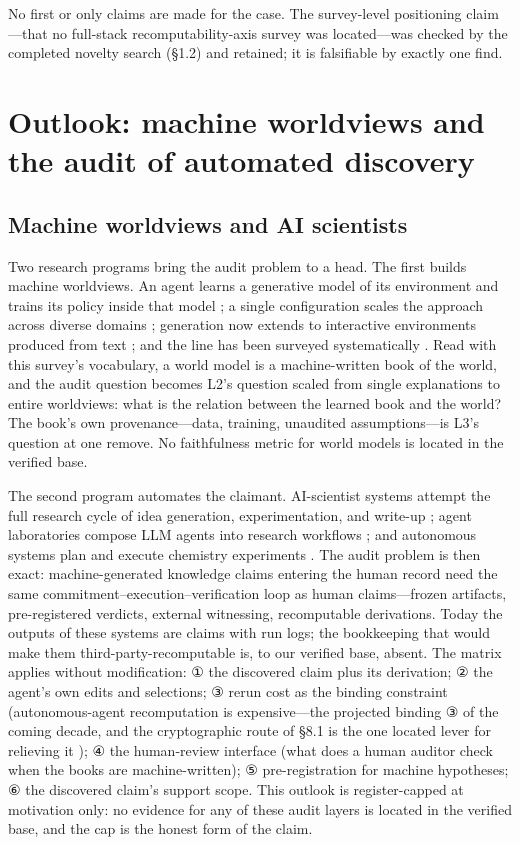 \documentclass[11pt,a4paper]{article}
\begin{document}
No first or only claims are made for the case. The survey-level positioning claim—that no full-stack recomputability-axis survey was located—was checked by the completed novelty search (§1.2) and retained; it is falsifiable by exactly one find.

\section{Outlook: machine worldviews and the audit of automated discovery}

\subsection{Machine worldviews and AI scientists}

Two research programs bring the audit problem to a head. The first builds machine worldviews. An agent learns a generative model of its environment and trains its policy inside that model \cite{key55}; a single configuration scales the approach across diverse domains \cite{key56}; generation now extends to interactive environments produced from text \cite{key57}; and the line has been surveyed systematically \cite{key58}. Read with this survey's vocabulary, a world model is a machine-written book of the world, and the audit question becomes L2's question scaled from single explanations to entire worldviews: what is the relation between the learned book and the world? The book's own provenance—data, training, unaudited assumptions—is L3's question at one remove. No faithfulness metric for world models is located in the verified base.

The second program automates the claimant. AI-scientist systems attempt the full research cycle of idea generation, experimentation, and write-up \cite{key59}; agent laboratories compose LLM agents into research workflows \cite{key60}; and autonomous systems plan and execute chemistry experiments \cite{key61}. The audit problem is then exact: machine-generated knowledge claims entering the human record need the same commitment–execution–verification loop as human claims—frozen artifacts, pre-registered verdicts, external witnessing, recomputable derivations. Today the outputs of these systems are claims with run logs; the bookkeeping that would make them third-party-recomputable is, to our verified base, absent. The matrix applies without modification: ① the discovered claim plus its derivation; ② the agent's own edits and selections; ③ rerun cost as the binding constraint (autonomous-agent recomputation is expensive—the projected binding ③ of the coming decade, and the cryptographic route of §8.1 is the one located lever for relieving it \cite{key53}); ④ the human-review interface (what does a human auditor check when the books are machine-written); ⑤ pre-registration for machine hypotheses; ⑥ the discovered claim's support scope. This outlook is register-capped at motivation only: no evidence for any of these audit layers is located in the verified base, and the cap is the honest form of the claim.
\end{document}
